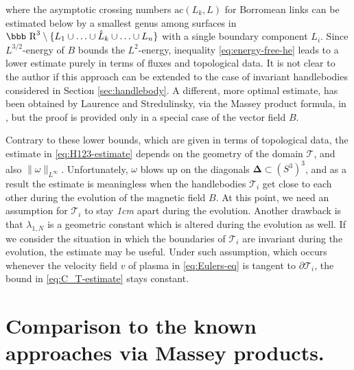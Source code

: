 \documentclass[12pt]{article}
\numberwithin{equation}{section}
\newcommand{\R}{\mbox{\bbb R}}       %
\begin{document}
where the asymptotic crossing numbers $\text{ac}(L_k,L)$  for Borromean links can be estimated below by
a smallest genus among surfaces in $\R^3\setminus \{L_1\cup\ldots\cup\hat{L}_k\cup\ldots\cup L_n\}$
with a single boundary component $L_i$.  Since $L^{3/2}$-energy of $B$ bounds the $L^2$-energy, inequality
\eqref{eq:energy-free-he} leads to a lower estimate purely in terms of fluxes and topological data.
It is not clear to the author if this approach can be extended to the case of invariant handlebodies 
considered in Section \ref{sec:handlebody}.
A different, more optimal estimate, has been obtained by Laurence and Stredulinsky, via the Massey product formula, in \cite{Laurence-Stredulinsky00a}, but the proof is provided only in a special case of the vector field $B$.

Contrary to these lower bounds, which are given in terms of topological data, the estimate in \eqref{eq:H123-estimate} depends on the geometry of the domain $\mathcal{T}$, and also $\|\omega\|_{L^\infty}$. Unfortunately, $\omega$ blows up on the diagonals $\mathbf{\Delta}\subset (S^3)^3$, and as a result the estimate is meaningless when the handlebodies 
$\mathcal{T}_i$ get close to each other during the evolution of the magnetic field $B$. At this point, we need an assumption for $\mathcal{T}_i$ to stay \emph{1cm} apart during the evolution.
Another drawback is that $\lambda_{1,N}$ is a geometric constant which is altered during the evolution as well. If we consider the situation in which the boundaries of $\mathcal{T}_i$ are invariant during the evolution, the estimate may be useful. Under such assumption, which occurs whenever the velocity field $v$ of plasma in \eqref{eq:Eulers-eq} is tangent to $\partial\mathcal{T}_i$, the bound in \eqref{eq:C_T-estimate} stays constant. 



\section{Comparison to the known approaches via Massey products.}\label{sec:massey}
\end{document}
